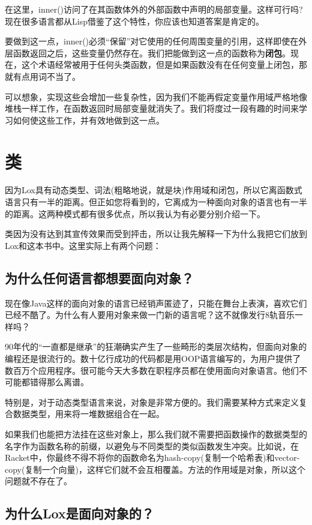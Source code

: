 \documentclass[cn,11pt,chinese]{elegantbook}
\begin{document}
在这里，inner()访问了在其函数体外的外部函数中声明的局部变量。这样可行吗?现在很多语言都从Lisp借鉴了这个特性，你应该也知道答案是肯定的。

要做到这一点，inner()必须“保留”对它使用的任何周围变量的引用，这样即使在外层函数返回之后，这些变量仍然存在。我们把能做到这一点的函数称为\textbf{闭包}。现在，这个术语经常被用于任何头类函数，但是如果函数没有在任何变量上闭包，那就有点用词不当了。

可以想象，实现这些会增加一些复杂性，因为我们不能再假定变量作用域严格地像堆栈一样工作，在函数返回时局部变量就消失了。我们将度过一段有趣的时间来学习如何使这些工作，并有效地做到这一点。

\section{类}

因为Lox具有动态类型、词法(粗略地说，就是块)作用域和闭包，所以它离函数式语言只有一半的距离。但正如您将看到的，它离成为一种面向对象的语言也有一半的距离。这两种模式都有很多优点，所以我认为有必要分别介绍一下。

类因为没有达到其宣传效果而受到抨击，所以让我先解释一下为什么我把它们放到Lox和这本书中。这里实际上有两个问题：

\subsection{为什么任何语言都想要面向对象？}

现在像Java这样的面向对象的语言已经销声匿迹了，只能在舞台上表演，喜欢它们已经不酷了。为什么有人要用对象来做一门新的语言呢？这不就像发行8轨音乐一样吗？

90年代的“一直都是继承”的狂潮确实产生了一些畸形的类层次结构，但面向对象的编程还是很流行的。数十亿行成功的代码都是用OOP语言编写的，为用户提供了数百万个应用程序。很可能今天大多数在职程序员都在使用面向对象语言。他们不可能都错得那么离谱。

特别是，对于动态类型语言来说，对象是非常方便的。我们需要某种方式来定义复合数据类型，用来将一堆数据组合在一起。

如果我们也能把方法挂在这些对象上，那么我们就不需要把函数操作的数据类型的名字作为函数名称的前缀，以避免与不同类型的类似函数发生冲突。比如说，在Racket中，你最终不得不将你的函数命名为hash-copy(复制一个哈希表)和vector-copy(复制一个向量)，这样它们就不会互相覆盖。方法的作用域是对象，所以这个问题就不存在了。

\subsection{为什么Lox是面向对象的？}
\end{document}
